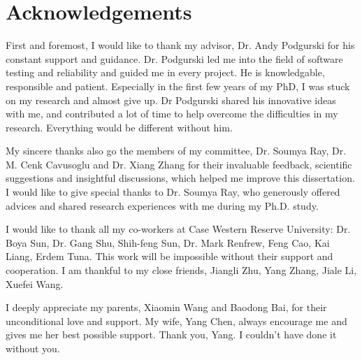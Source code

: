 
\newpage
\section*{Acknowledgements}
First and foremost, I would like to thank my advisor, Dr. Andy Podgurski for his constant support and guidance.  Dr. Podgurski led me into the field of software testing and reliability and guided me in every project. He is  knowledgable, responsible and patient.  Especially in the first few years of my PhD, I was stuck on my research and almost give up. Dr Podgurski shared his innovative ideas with me, and contributed a lot of time to help overcome the difficulties in my research. Everything would be different without him. 

My sincere thanks also go the members of my committee, Dr. Soumya Ray,  Dr. M. Cenk Cavusoglu and Dr. Xiang Zhang for their invaluable feedback, scientific suggestions and insightful discussions, which helped me improve this dissertation. I would like to give special thanks to Dr. Soumya Ray, who generously offered advices and shared research experiences with me during my Ph.D. study.

I would like to thank all my co-workers at Case Western Reserve University: Dr. Boya Sun, Dr. Gang Shu, Shih-feng Sun, Dr. Mark Renfrew, Feng Cao, Kai Liang,  Erdem Tuna. This work will be impossible without their support and cooperation. I am thankful to my close friends, Jiangli Zhu, Yang Zhang, Jiale Li, Xuefei Wang. 

I deeply appreciate my parents, Xiaomin Wang and Baodong Bai, for their unconditional love and support. My wife, Yang Chen, always encourage me and gives me her best possible support. Thank you, Yang. I couldn’t have done it without you. 

